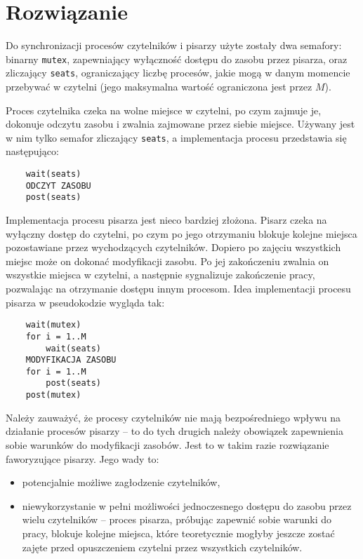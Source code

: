 \documentclass{article}
\begin{document}
\section{Rozwiązanie}

Do synchronizacji procesów czytelników i pisarzy użyte zostały dwa semafory:
binarny \texttt{mutex}, zapewniający wyłączność dostępu do zasobu przez pisarza,
oraz zliczający \texttt{seats}, ograniczający liczbę procesów,
jakie mogą w danym momencie przebywać w czytelni (jego maksymalna wartość ograniczona jest przez $M$).

Proces czytelnika czeka na wolne miejsce w czytelni,
po czym zajmuje je, dokonuje odczytu zasobu i zwalnia zajmowane przez siebie miejsce.
Używany jest w nim tylko semafor zliczający \texttt{seats},
a implementacja procesu przedstawia się następująco:

\begin{verbatim}
    wait(seats)
    ODCZYT ZASOBU
    post(seats)
\end{verbatim}

Implementacja procesu pisarza jest nieco bardziej złożona.
Pisarz czeka na wyłączny dostęp do czytelni,
po czym po jego otrzymaniu blokuje kolejne miejsca pozostawiane przez wychodzących czytelników.
Dopiero po zajęciu wszystkich miejsc może on dokonać modyfikacji zasobu.
Po jej zakończeniu zwalnia on wszystkie miejsca w czytelni,
a następnie sygnalizuje zakończenie pracy, pozwalając na otrzymanie dostępu innym procesom.
Idea implementacji procesu pisarza w pseudokodzie wygląda tak:

\begin{verbatim}
    wait(mutex)
    for i = 1..M
        wait(seats)
    MODYFIKACJA ZASOBU
    for i = 1..M
        post(seats)
    post(mutex)
\end{verbatim}

Należy zauważyć, że procesy czytelników nie mają bezpośredniego wpływu na działanie procesów pisarzy
-- to do tych drugich należy obowiązek zapewnienia sobie warunków do modyfikacji zasobów.
Jest to w takim razie rozwiązanie faworyzujące pisarzy.
Jego wady to:

\begin{itemize}
    \item potencjalnie możliwe zagłodzenie czytelników,
    \item niewykorzystanie w pełni możliwości jednoczesnego dostępu do zasobu przez wielu czytelników
        -- proces pisarza, próbując zapewnić sobie warunki do pracy, blokuje kolejne miejsca,
        które teoretycznie mogłyby jeszcze zostać zajęte przed opuszczeniem czytelni przez wszystkich czytelników.
\end{itemize}
\end{document}
